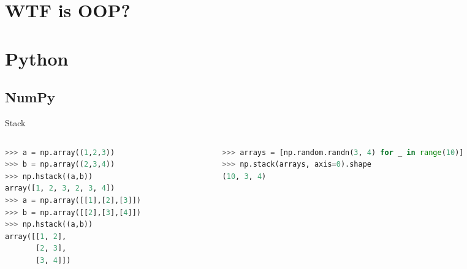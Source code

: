 \documentclass[main.tex]{subfiles}
\begin{document}
\section{WTF is OOP?}

\section{Python}

\subsection{NumPy}

\begin{frame}[fragile]{Stack}
\begin{columns}[T]
\begin{column}{0.5\textwidth}
\begin{lstlisting}[language=Python,basicstyle=\Tiny]
>>> a = np.array((1,2,3))
>>> b = np.array((2,3,4))
>>> np.hstack((a,b))
array([1, 2, 3, 2, 3, 4])
>>> a = np.array([[1],[2],[3]])
>>> b = np.array([[2],[3],[4]])
>>> np.hstack((a,b))
array([[1, 2],
       [2, 3],
       [3, 4]])
\end{lstlisting}
\end{column}
\begin{column}{0.5\textwidth}
\begin{lstlisting}[language=Python,basicstyle=\Tiny]
>>> arrays = [np.random.randn(3, 4) for _ in range(10)]
>>> np.stack(arrays, axis=0).shape
(10, 3, 4)
\end{lstlisting}
\end{column}
\end{columns}
\end{frame}
\end{document}
